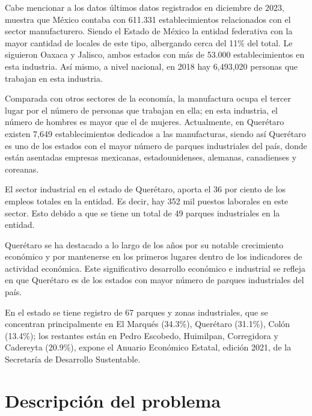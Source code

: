       
    Cabe mencionar a  los datos últimos datos registrados en diciembre de 2023, muestra que México contaba con 611.331 establecimientos relacionados con el sector manufacturero. Siendo el Estado de México la entidad federativa con la mayor cantidad de locales de este tipo, albergando cerca del 11\% del total. Le siguieron Oaxaca y Jalisco, ambos estados con más de 53.000 establecimientos en esta industria. Así mismo, a nivel nacional, en 2018 hay 6,493,020 personas que trabajan en esta industria.
    
    Comparada con otros sectores de la economía, la manufactura ocupa el tercer lugar por el número de personas que trabajan en ella; en esta industria, el número de hombres es mayor que el de mujeres.
    Actualmente, en Querétaro existen 7,649 establecimientos dedicados a las manufacturas, siendo así Querétaro es uno de los estados con el mayor número de parques industriales del país, donde están asentadas empresas mexicanas, estadounidenses, alemanas, canadienses y coreanas.
       
        
        El sector industrial en el estado de Querétaro, aporta el 36 por ciento de los empleos totales en la entidad. Es decir, hay 352 mil puestos laborales en este sector. Esto debido a que se tiene un total de 49 parques industriales en la entidad.
        
        Querétaro se ha destacado a lo largo de los años por su notable crecimiento económico y por mantenerse en los primeros lugares dentro de los indicadores de actividad económica. Este significativo desarrollo económico e industrial se refleja en que Querétaro es de los estados con mayor número de parques industriales del país. \cite{JessicaIgnot}
        
        En el estado se tiene registro de 67 parques y zonas industriales, que se concentran principalmente en El Marqués (34.3\%), Querétaro (31.1\%), Colón (13.4\%); los restantes están en Pedro Escobedo, Huimilpan, Corregidora y Cadereyta (20.9\%), expone el Anuario Económico Estatal, edición 2021, de la Secretaría de Desarrollo Sustentable.
    
    \section{Descripción del problema}
    

